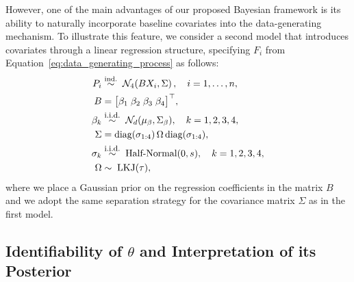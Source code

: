 \documentclass[12pt]{article}
\newcommand{\iid}{\overset{\text{\footnotesize i.i.d.}}{\sim}}
\begin{document}
However, one of the main advantages of our proposed Bayesian framework is its ability to naturally incorporate baseline covariates into the data-generating mechanism. To illustrate this feature, we consider a second model that introduces covariates through a linear regression structure, specifying \(F_{i}\) from Equation~\eqref{eq:data_generating_process} as follows:
\begin{equation}
  \label{eq:parametric_model_covariates}
  \begin{aligned}
    P_{i} &\overset{\text{ind.}}{\sim}\;
            \mathcal{N}_{4}\!\left( B X_{i} , \Sigma \right), \quad i=1,\ldots,n, \\
    B &= \big[ \beta_{1} \; \beta_{2} \; \beta_{3} \; \beta_{4} \big]^{\top}, \\
    \beta_{k} & \iid \; \mathcal{N}_{d}(\mu_{\beta}, \Sigma_{\beta}), \quad k = 1,2,3,4, \\
    \Sigma &= \text{diag}(\sigma_{1:4}) \,\Omega\, \text{diag}(\sigma_{1:4}), \\
    \sigma_{k} &\iid \; \text{Half-Normal}(0, s), \quad k = 1,2,3,4, \\
    \Omega & \sim \; \text{LKJ}(\tau),
  \end{aligned}
\end{equation}
where we place a Gaussian prior on the regression coefficients in the matrix \(B\) and we adopt the same separation strategy for the covariance matrix \(\Sigma\) as in the first model.

\subsection{Identifiability of \texorpdfstring{\(\theta\)}{theta} and Interpretation of its Posterior}
\label{subsection:identifiability}
\end{document}
